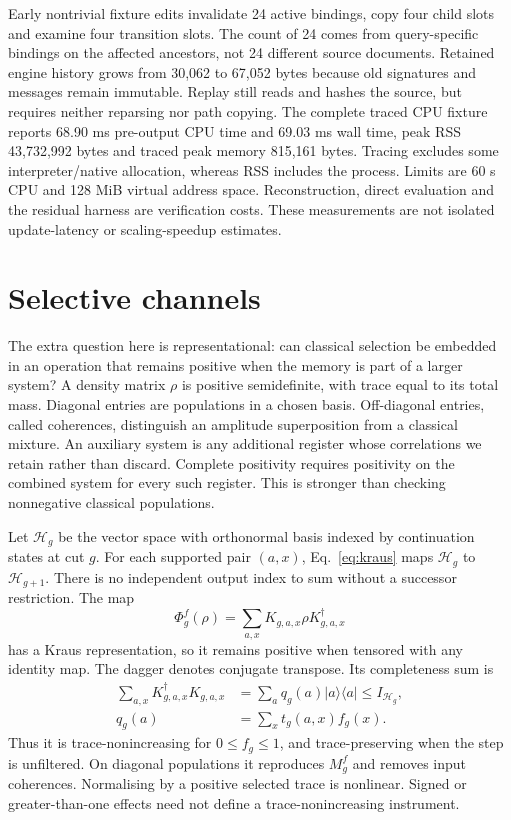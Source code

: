 Early nontrivial fixture edits invalidate 24 active bindings, copy four child slots and examine four transition slots.
The count of 24 comes from query-specific bindings on the affected ancestors, not 24 different source documents.
Retained engine history grows from 30,062 to 67,052 bytes because old signatures and messages remain immutable.
Replay still reads and hashes the source, but requires neither reparsing nor path copying.
The complete traced CPU fixture reports 68.90 ms pre-output CPU time and 69.03 ms wall time, peak RSS 43,732,992 bytes and traced peak memory 815,161 bytes.
Tracing excludes some interpreter/native allocation, whereas RSS includes the process.
Limits are 60 s CPU and 128 MiB virtual address space.
Reconstruction, direct evaluation and the residual harness are verification costs.
These measurements are not isolated update-latency or scaling-speedup estimates.

\section{Selective channels}
\label{app:dm-channel}
The extra question here is representational: can classical selection be embedded in an operation that remains positive when the memory is part of a larger system?
A density matrix \(\rho\) is positive semidefinite, with trace equal to its total mass.
Diagonal entries are populations in a chosen basis.
Off-diagonal entries, called coherences, distinguish an amplitude superposition from a classical mixture.
An auxiliary system is any additional register whose correlations we retain rather than discard.
Complete positivity requires positivity on the combined system for every such register.
This is stronger than checking nonnegative classical populations.

Let \(\mathcal H_g\) be the vector space with orthonormal basis indexed by continuation states at cut \(g\).
For each supported pair \((a,x)\), Eq.~\eqref{eq:kraus} maps \(\mathcal H_g\) to \(\mathcal H_{g+1}\).
There is no independent output index to sum without a successor restriction.
The map
\begin{equation}
 \Phi_g^f(\rho)=\sum_{a,x}K_{g,a,x}\rho K_{g,a,x}^{\dagger}
\end{equation}
has a Kraus representation, so it remains positive when tensored with any identity map.
The dagger denotes conjugate transpose.
Its completeness sum is
\begin{equation}
 \begin{aligned}
 \sum_{a,x}K_{g,a,x}^{\dagger}K_{g,a,x}
 &=\sum_a q_g(a)|a\rangle\langle a|\leq I_{\mathcal H_g},\\
 q_g(a)&=\sum_xt_g(a,x)f_g(x).
 \end{aligned}
\end{equation}
Thus it is trace-nonincreasing for \(0\leq f_g\leq1\), and trace-preserving when the step is unfiltered.
On diagonal populations it reproduces \(M_g^f\) and removes input coherences.
Normalising by a positive selected trace is nonlinear.
Signed or greater-than-one effects need not define a trace-nonincreasing instrument.

